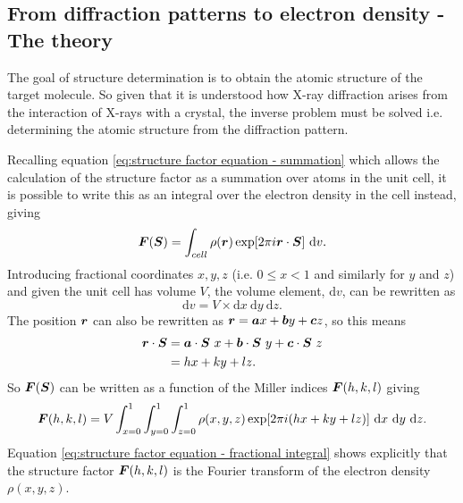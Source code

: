     \subsection{From diffraction patterns to electron density - The theory}
    \label{sub:From diffraction patterns to electron density - The theory}
        The goal of structure determination is to obtain the atomic structure of the target molecule.
        So given that it is understood how X-ray diffraction arises from the interaction of X-rays with a crystal, the inverse problem must be solved i.e. determining the atomic structure from the diffraction pattern.

        Recalling equation \ref{eq:structure factor equation - summation} which allows the calculation of the structure factor as a summation over atoms in the unit cell, it is possible to write this as an integral over the electron density in the cell instead, giving
        \begin{equation}
            \boldsymbol{F}(\boldsymbol{S}) = \int_{cell} \rho(\boldsymbol{r})\exp[2 \pi i \boldsymbol{r} \cdot \boldsymbol{S}]\ \mathrm{d}v.
            \label{eq:structure factor equation - integral}
        \end{equation}
        Introducing fractional coordinates $x, y, z$ (i.e. $0 \leq x < 1$ and similarly for $y$ and $z$) and given the unit cell has volume $V$, the volume element, $\mathrm{d}v$, can be rewritten as
        \begin{equation}
            \mathrm{d}v = V \times \mathrm{d}x\ \mathrm{d}y\ \mathrm{d}z.
        \end{equation}
        The position $\boldsymbol{r}$ can also be rewritten as $\boldsymbol{r} = \boldsymbol{a}x + \boldsymbol{b}y + \boldsymbol{c}z$, so this means
        \begin{align}
            \boldsymbol{r} \cdot \boldsymbol{S} &= \boldsymbol{a}\cdot\boldsymbol{S}\ x + \boldsymbol{b}\cdot\boldsymbol{S}\ y + \boldsymbol{c}\cdot\boldsymbol{S}\ z \\
            &= hx + ky + lz.
        \end{align}
        So $\boldsymbol{F}(\boldsymbol{S})$ can be written as a function of the Miller indices $\boldsymbol{F}(h,k,l)$ giving
        \begin{equation}
            \bs{F}(h,k,l) = V \int_{x=0}^1 \int_{y=0}^1 \int_{z=0}^1 \rho(x,y,z) \exp[2\pi i (hx + ky + lz)]\ \mathrm{d}x\ \mathrm{d}y\ \mathrm{d}z.
            \label{eq:structure factor equation - fractional integral}
        \end{equation}
        Equation \ref{eq:structure factor equation - fractional integral} shows explicitly that the structure factor $\boldsymbol{F}(h,k,l)$ is the Fourier transform of the electron density $\rho(x,y,z)$.
